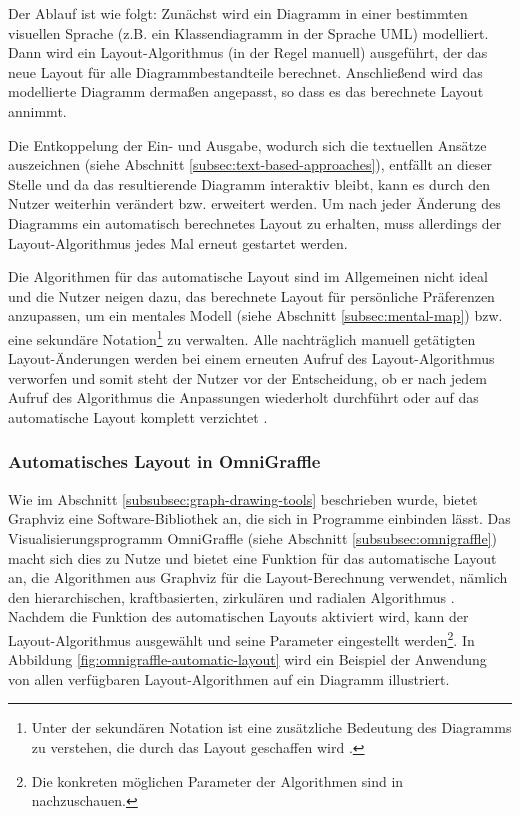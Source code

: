 Der Ablauf ist wie folgt: Zunächst wird ein Diagramm in einer bestimmten visuellen Sprache (z.B. ein Klassendiagramm in der Sprache UML) modelliert. Dann wird ein Layout-Algorithmus (in der Regel manuell) ausgeführt, der das neue Layout für alle Diagrammbestandteile berechnet. Anschließend wird das modellierte Diagramm dermaßen angepasst, so dass es das berechnete Layout annimmt.

Die Entkoppelung der Ein- und Ausgabe, wodurch sich die textuellen Ansätze auszeichnen (siehe Abschnitt \ref{subsec:text-based-approaches}), entfällt an dieser Stelle und da das resultierende Diagramm interaktiv bleibt, kann es durch den Nutzer weiterhin verändert bzw. erweitert werden. Um nach jeder Änderung des Diagramms ein automatisch berechnetes Layout zu erhalten, muss allerdings der Layout-Algorithmus jedes Mal erneut gestartet werden.

Die Algorithmen für das automatische Layout sind im Allgemeinen nicht ideal und die Nutzer neigen dazu, das berechnete Layout für persönliche Präferenzen anzupassen, um ein mentales Modell (siehe Abschnitt \ref{subsec:mental-map}) bzw. eine sekundäre Notation\footnote{Unter der sekundären Notation ist eine zusätzliche Bedeutung des Diagramms zu verstehen, die durch das Layout geschaffen wird \cite{SeyboldGlinz03An-Effective}.} zu verwalten. Alle nachträglich manuell getätigten Layout-Änderungen werden bei einem erneuten Aufruf des Layout-Algorithmus verworfen und somit steht der Nutzer vor der Entscheidung, ob er nach jedem Aufruf des Algorithmus die Anpassungen wiederholt durchführt oder auf das automatische Layout komplett verzichtet \cite[S.119ff]{Eiglsperger04Automatic}.

\subsubsection{Automatisches Layout in OmniGraffle}
\label{subsubsec:omnigraffle-auto-layout}

Wie im Abschnitt \ref{subsubsec:graph-drawing-tools} beschrieben wurde, bietet Graphviz eine Software-Bibliothek an, die sich in Programme einbinden lässt. Das Visualisierungsprogramm OmniGraffle (siehe Abschnitt \ref{subsubsec:omnigraffle}) macht sich dies zu Nutze und bietet eine Funktion für das automatische Layout an, die Algorithmen aus Graphviz für die Layout-Berechnung verwendet, nämlich den hierarchischen, kraftbasierten, zirkulären und radialen Algorithmus \cite{Olsen10OmniGraffle}. Nachdem die Funktion des automatischen Layouts aktiviert wird, kann der Layout-Algorithmus ausgewählt und seine Parameter eingestellt werden\footnote{Die konkreten möglichen Parameter der Algorithmen sind in \cite[S.74]{08OmniGraffle} nachzuschauen.}. In Abbildung \ref{fig:omnigraffle-automatic-layout} wird ein Beispiel der Anwendung von allen verfügbaren Layout-Algorithmen auf ein Diagramm illustriert.

